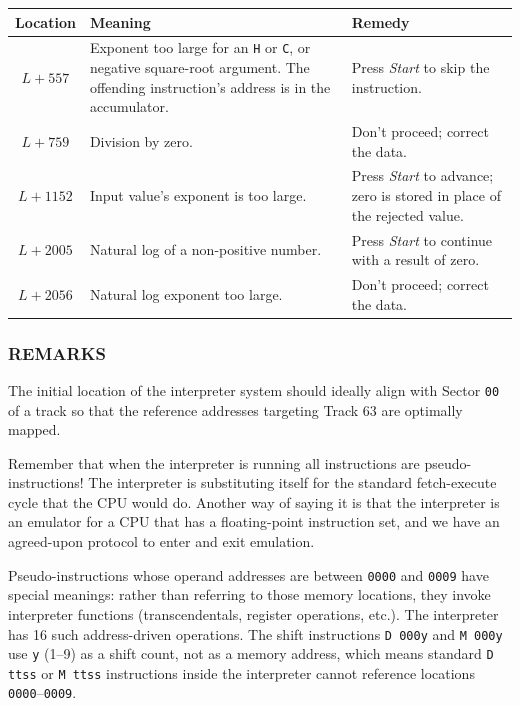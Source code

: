 \begin{table}[h]
\centering
\setlength{\extrarowheight}{4pt}
\begin{tabular}{|c|p{5cm}|p{4.5cm}|}
\hline
\textbf{Location} & \textbf{Meaning} & \textbf{Remedy} \\ \hline
$L+557$ & Exponent too large for an \texttt{H} or \texttt{C}, or negative square-root argument. The offending instruction's address is in the accumulator. & Press \textit{Start} to skip the instruction. \\ \hline
$L+759$ & Division by zero. & Don't proceed; correct the data. \\ \hline
$L+1152$ & Input value's exponent is too large. & Press \textit{Start} to advance; zero is stored in place of the rejected value. \\ \hline
$L+2005$ & Natural log of a non-positive number. & Press \textit{Start} to continue with a result of zero. \\ \hline
$L+2056$ & Natural log exponent too large. & Don't proceed; correct the data. \\ \hline
\end{tabular}
\end{table}

\subsubsection*{REMARKS}

The initial location of the interpreter system should ideally align with Sector \texttt{00} of a track so that the reference addresses targeting Track 63 are optimally mapped.

Remember that when the interpreter is running all instructions are pseudo-instructions! The interpreter is substituting itself for the standard fetch-execute cycle that the CPU would do. Another way of saying it is that the interpreter is an emulator for a CPU that has a floating-point instruction set, and we have an agreed-upon protocol to enter and exit emulation.

Pseudo-instructions whose operand addresses are between \texttt{0000} and \texttt{0009} have special meanings: rather than referring to those memory locations, they invoke interpreter functions (transcendentals, register operations, etc.). The interpreter has 16 such address-driven operations. The shift instructions \texttt{D 000y} and \texttt{M 000y} use \texttt{y} (1--9) as a shift count, not as a memory address, which means standard \texttt{D ttss} or \texttt{M ttss} instructions inside the interpreter cannot reference locations \texttt{0000}--\texttt{0009}.

